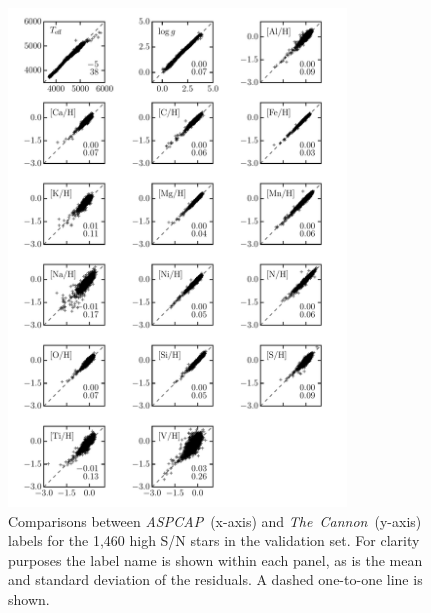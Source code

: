 \documentclass[12pt,preprint]{aastex6}
\newcommand{\project}[1]{\textsl{#1}}
\newcommand{\TheCannon}{\project{The~Cannon}}
\newcommand{\acronym}[1]{{\small{#1}}}
\newcommand{\aspcap}{\project{\acronym{ASPCAP}}}
\begin{document}
\begin{figure}[p]
\centering
\includegraphics[width=0.8\textwidth]{regularized-model-validation.pdf}
\caption{Comparisons between \aspcap\ (x-axis) and \TheCannon\ (y-axis)
labels for the 1,460 high S/N stars in the validation set.  For clarity
purposes the label name is shown within each panel, as is the mean
and standard deviation of the residuals.  A
dashed one-to-one line is shown.
\label{fig:regularized-model-validation}}
\end{figure}

\clearpage
\end{document}
